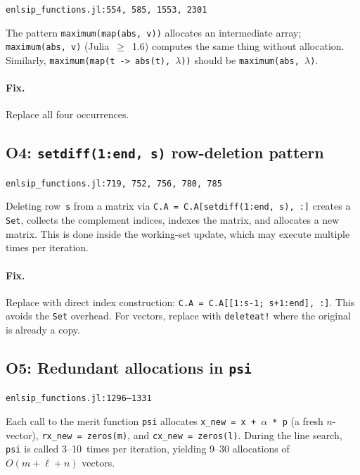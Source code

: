 \documentclass[11pt, a4paper]{article}
\newcommand{\juliaref}[2]{\texttt{#1:#2}}
\begin{document}
\juliaref{enlsip\_functions.jl}{554, 585, 1553, 2301}

The pattern \texttt{maximum(map(abs, v))} allocates an intermediate array;
\texttt{maximum(abs, v)} (Julia~$\geq$~1.6) computes the same thing
without allocation.  Similarly, \texttt{maximum(map(t -> abs(t), $\lambda$))}
should be \texttt{maximum(abs, $\lambda$)}.

\paragraph{Fix.}
Replace all four occurrences.

\subsection{O4: \texttt{setdiff(1:end, s)} row-deletion pattern}
\label{sec:o4}

\juliaref{enlsip\_functions.jl}{719, 752, 756, 780, 785}

Deleting row~\texttt{s} from a matrix via
\texttt{C.A = C.A[setdiff(1:end, s), :]} creates a \texttt{Set},
collects the complement indices, indexes the matrix, and allocates a new
matrix.  This is done inside the working-set update, which may execute
multiple times per iteration.

\paragraph{Fix.}
Replace with direct index construction:
\texttt{C.A = C.A[[1:s-1; s+1:end], :]}.
This avoids the \texttt{Set} overhead.  For vectors, replace with
\texttt{deleteat!} where the original is already a copy.

\subsection{O5: Redundant allocations in \texttt{psi}}
\label{sec:o5}

\juliaref{enlsip\_functions.jl}{1296--1331}

Each call to the merit function \texttt{psi} allocates
\texttt{x\_new = x + $\alpha$ * p} (a fresh $n$-vector),
\texttt{rx\_new = zeros(m)}, and \texttt{cx\_new = zeros(l)}.
During the line search, \texttt{psi} is called 3--10~times per
iteration, yielding 9--30 allocations of $O(m+\ell+n)$ vectors.
\end{document}
